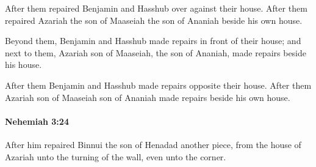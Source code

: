 			\begin{versebox}
					\item[BHS] 
					\item[LXX] 
					\item[ASV] After them repaired Benjamin and Hasshub over against their house. After them repaired Azariah the son of Maaseiah the son of Ananiah beside his own house.
					\item[NIV] Beyond them, Benjamin and Hasshub made repairs in front of their house; and next to them, Azariah son of Maaseiah, the son of Ananiah, made repairs beside his house.
					\item[NRSV] After them Benjamin and Hasshub made repairs opposite their house. After them Azariah son of Maaseiah son of Ananiah made repairs beside his own house.
			\end{versebox}

		\paragraph{Nehemiah 3:24} %
			\label{NEHEMIAH-3-24}

			After him repaired Binnui the son of Henadad another piece, from the house of Azariah unto the turning of the wall, even unto the corner.

